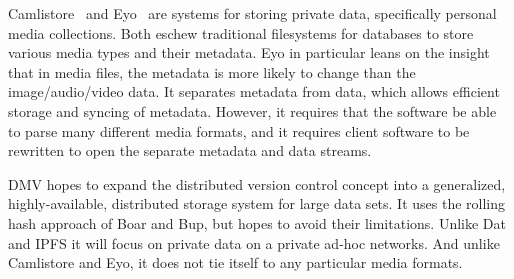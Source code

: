 Camlistore~\cite{camlistore_homepage} and Eyo~\cite{Strauss:2011:EDP:2002181.2002216} are systems for storing private data, specifically personal media collections.
Both eschew traditional filesystems for databases to store various media types and their metadata.
Eyo in particular leans on the insight that in media files, the metadata is more likely to change than the image/audio/video data.
It separates metadata from data, which allows efficient storage and syncing of metadata.
However, it requires that the software be able to parse many different media formats, and it requires client software to be rewritten to open the separate metadata and data streams.

DMV hopes to expand the distributed version control concept into a generalized, highly-available, distributed storage system for large data sets.
It uses the rolling hash approach of Boar and Bup, but hopes to avoid their limitations.
Unlike Dat and IPFS it will focus on private data on a private ad-hoc networks.
And unlike Camlistore and Eyo, it does not tie itself to any particular media formats.

